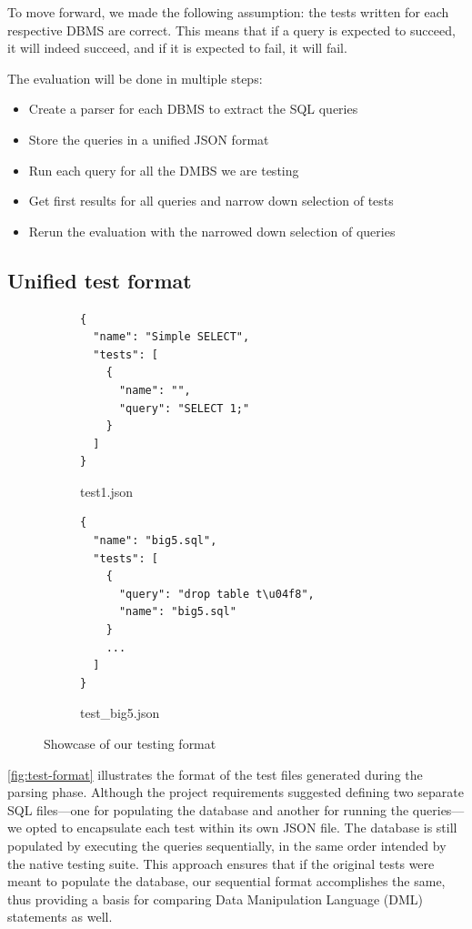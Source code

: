 \documentclass[acmsmall,nonacm]{acmart}
\begin{document}
To move forward, we made the following assumption: the tests written for each respective DBMS are correct. This means that if a query is expected to succeed, it will indeed succeed, and if it is expected to fail, it will fail.

The evaluation will be done in multiple steps:
\begin{itemize}
    \item Create a parser for each DBMS to extract the SQL queries
    \item Store the queries in a unified JSON format
    \item Run each query for all the DMBS we are testing
    \item Get first results for all queries and narrow down selection of tests %
    \item Rerun the evaluation with the narrowed down selection of queries
\end{itemize}

\subsection{Unified test format}
\begin{figure}
\vspace{-0.4cm}
\begin{subfigure}[t]{\linewidth}
\begin{verbatim}
{
  "name": "Simple SELECT",
  "tests": [
    {
      "name": "",
      "query": "SELECT 1;"
    }
  ]
}
\end{verbatim}
test1.json
\begin{verbatim}
{
  "name": "big5.sql",
  "tests": [
    {
      "query": "drop table t\u04f8",
      "name": "big5.sql"
    }
    ...
  ]
}
\end{verbatim}
test\_big5.json
\end{subfigure}
\caption{Showcase of our testing format}
\vspace{-0.5cm}
\label{fig:test-format}
\vspace{-0.5cm}
\end{figure}
\autoref{fig:test-format} illustrates the format of the test files generated during the parsing phase. Although the project requirements suggested defining two separate SQL files—one for populating the database and another for running the queries—we opted to encapsulate each test within its own JSON file. The database is still populated by executing the queries sequentially, in the same order intended by the native testing suite. This approach ensures that if the original tests were meant to populate the database, our sequential format accomplishes the same, thus providing a basis for comparing Data Manipulation Language (DML) statements as well.
\end{document}
